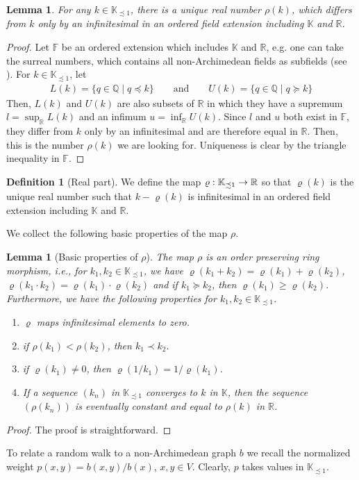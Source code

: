 \documentclass[a4paper,oneside, 12pt]{amsart}
\numberwithin{theorem}{section}
\newtheorem{lemma}[theorem]{Lemma}
\theoremstyle{definition}
\newtheorem{definition}[theorem]{Definition}
\newcommand{\K}{\mathbb{K}}
\newcommand{\Kf}{\mathbb K_{\precsim 1}}
\newcommand{\map}{\varrho}
\begin{document}
{\begin{lemma}\label{lem:existencerho}
	For any $k\in \Kf$, there is a unique real number $ \rho(k) $, which differs from $k$ only by an infinitesimal in an ordered field extension including $ \K $ and $ \mathbb{R} $.
\end{lemma}
\begin{proof}
	Let $ \mathbb{F} $ be an ordered extension which includes $ \mathbb{K} $ and $ \mathbb{R} $, e.g. one can take the surreal numbers, which contains all non-Archimedean fields as subfields  (see \cite[Theorem 24.29]{Bajnok}).
	For $ k\in \Kf $, let
	\begin{align*}
		L(k)=\{  q\in \mathbb{Q}\mid q\preceq k\}\qquad\mbox{and}\qquad 	U(k)=\{  q\in \mathbb{Q}\mid q\succeq k\}
	\end{align*}
Then, $ L(k) $ and $ U(k) $ are also subsets of $ \mathbb{R} $ in which they have a supremum $ l=\sup_{\mathbb{R}}L(k) $ and an infimum $ u=\inf_{\mathbb{R}}U(k) $.
Since $ l $ and $u  $ both exist in $ \mathbb{F}$,  they differ from $ k $ only by an infinitesimal and are therefore equal in $ \mathbb{R} $. Then, this is the number $ \rho(k) $ we are looking for. Uniqueness is clear by  the triangle inequality in $ \mathbb{F} $.
\end{proof}

\begin{definition}[Real part]\label{def::map}
 We define the map  $\map:\Kf\to\Bbb R$ so that  $\map(k)$ is the unique real number  such that $k-\map(k)$ is infinitesimal in an ordered field extension including $ \K $ and $ \mathbb{R} $.
\end{definition}

We collect the following basic properties of the map $ \rho $.
\begin{lemma}[Basic properties of $ \rho $]\label{lem::mapProp}
	The map $ \rho $ is an order preserving  ring morphism, i.e., for  $ k_{1},k_{2}\in \Kf $, we have 
 $\map(k_1+k_2)=\map(k_1)+\map(k_2)$,  $\map(k_1\cdot k_2)=\map(k_1)\cdot \map(k_2)$ and  if $k_1\succeq k_2$, then $\map(k_1)\ge \map(k_2)$.
Furthermore, we have the following properties for  $ k_{1},k_{2}\in \Kf $.
\begin{enumerate}[label=$(\arabic*)$]
\item
$ \map $ maps infinitesimal elements to zero.
\item if $\rho(k_1)< \rho (k_2)$, then $k_1\prec k_2.$
\item if $\map(k_1)\ne 0$, then $\map(1/k_1)=1/\map(k_1)$.
\item If a sequence $(k_n)$  in  $\Kf$ converges to  $k$  in  $ \K$, then the sequence $(\rho(k_n))$ is eventually constant and equal to  $\rho(k)$ in $ \mathbb{R} $.
\end{enumerate}
\end{lemma}
\begin{proof}
	The proof is straightforward.
\end{proof}
 To  relate a  random walk to a non-Archimedean graph $ b $ we recall the normalized weight $ p(x,y)=b(x,y)/b(x) $, $ x,y\in V $. Clearly, $ p $ takes values in $ \Kf $.


}
\end{document}
